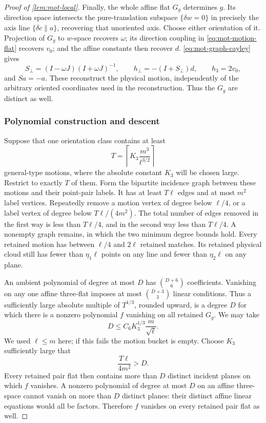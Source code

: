 \begin{proof}[Proof of \cref{lem:mot-local}]
Finally, the whole affine flat $G_g$ determines $g$.  Its direction space intersects the pure-translation subspace $\{\delta w=0\}$ in precisely the axis line $\{\delta c\parallel a\}$, recovering that unoriented axis. Choose either orientation of it.  Projection of $G_g$ to $w$-space recovers $\omega$; its direction coupling in \eqref{eq:mot-motion-flat} recovers $v_0$; and the affine constants then recover $d$.  \eqref{eq:mot-graph-cayley} gives
\[
 S_\perp=(I-\omega J)(I+\omega J)^{-1},\qquad
 h_\perp=-(I+S_\perp)d,\qquad h_3=2v_0,
\]
and $Sa=-a$.  These reconstruct the physical motion, independently of the arbitrary oriented coordinates used in the reconstruction. Thus the $G_g$ are distinct as well.

\subsubsection{Polynomial construction and descent}

Suppose that one orientation class contains at least
\[
 T=\left\lceil K_3\frac{m^3}{\ell^{3/2}}\right\rceil
\]
general-type motions, where the absolute constant $K_3$ will be chosen large.  Restrict to exactly $T$ of them.  Form the bipartite incidence graph between these motions and their point-pair labels.  It has at least $T\ell$ edges and at most $m^2$ label vertices.  Repeatedly remove a motion vertex of degree below $\ell/4$, or a label vertex of degree below $T\ell/(4m^2)$.  The total number of edges removed in the first way is less than $T\ell/4$, and in the second way less than $T\ell/4$.  A nonempty graph remains, in which the two minimum degree bounds hold.  Every retained motion has between $\ell/4$ and $2\ell$ retained matches.  Its retained physical cloud still has fewer than $\eta_1\ell$ points on any line and fewer than $\eta_2\ell$ on any plane.

An ambient polynomial of degree at most $D$ has $\binom{D+6}{6}$ coefficients.  Vanishing on any one affine three-flat imposes at most $\binom{D+3}{3}$ linear conditions. Thus a sufficiently large absolute multiple of $T^{1/3}$, rounded upward, is a degree $D$ for which there is a nonzero polynomial $f$ vanishing on all retained $G_g$.  We may take
\begin{equation}
\label{eq:mot-degree-bound}
 D\le C_6K_3^{1/3}\frac{m}{\sqrt\ell}.
\end{equation}
We used $\ell\le m$ here; if this fails the motion bucket is empty.  Choose $K_3$ sufficiently large that
\[
 \frac{T\ell}{4m^2}>D.
\]
Every retained pair flat then contains more than $D$ distinct incident planes on which $f$ vanishes.  A nonzero polynomial of degree at most $D$ on an affine three-space cannot vanish on more than $D$ distinct planes: their distinct affine linear equations would all be factors.  Therefore $f$ vanishes on every retained pair flat as well.


\end{proof}
